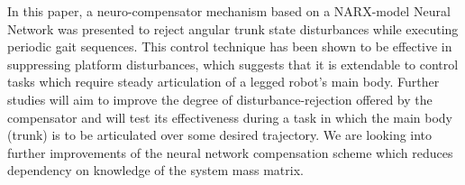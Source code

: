 
In this paper, a neuro-compensator mechanism based on a NARX-model Neural Network was presented to reject angular trunk state disturbances while executing periodic gait sequences. This control technique has been shown to be effective in suppressing platform disturbances, which suggests that it is extendable to control tasks which require steady articulation of a legged robot's main body. Further studies will aim to improve the degree of disturbance-rejection offered by the compensator and will test its effectiveness during a task in which the main body (trunk) is to be articulated over some desired trajectory. We are looking into further improvements of the neural network compensation scheme which reduces dependency on knowledge of the system mass matrix. 
